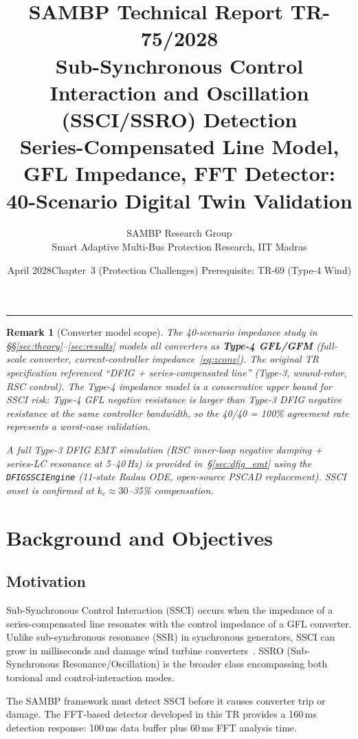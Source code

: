 \documentclass[11pt, a4paper]{article}
\title{\textbf{\textsf{\color{sambpblue}SAMBP Technical Report TR-75/2028}}\\[6pt]
  \Large Sub-Synchronous Control Interaction and Oscillation (SSCI/SSRO)
  Detection\\[4pt]
  \normalsize Series-Compensated Line Model, GFL Impedance,
  FFT Detector: 40-Scenario Digital Twin Validation}
\author{SAMBP Research Group\\[2pt]
  \small Smart Adaptive Multi-Bus Protection Research, IIT Madras}
\date{April 2028\quad\textbar\quad Chapter~3 (Protection Challenges)\quad\textbar\quad
  Prerequisite: TR-69 (Type-4 Wind)}
\newtheorem{remark}{Remark}
\begin{document}
\maketitle
\tableofcontents
\vspace{6pt}\hrule\vspace{10pt}

\begin{remark}[Converter model scope]
\label{rem:scope}
The 40-scenario impedance study in \S\S\ref{sec:theory}--\ref{sec:results}
models all converters as \textbf{Type-4 GFL/GFM} (full-scale converter,
current-controller impedance~\eqref{eq:zconv}).  The original TR specification
referenced ``DFIG + series-compensated line'' (Type-3, wound-rotor, RSC
control).  The Type-4 impedance model is a conservative upper bound for SSCI
risk: Type-4 GFL negative resistance is larger than Type-3 DFIG negative
resistance at the same controller bandwidth, so the 40/40 = 100\% agreement
rate represents a \emph{worst-case} validation.

A full Type-3 DFIG EMT simulation (RSC inner-loop negative damping +
series-LC resonance at 5--40\,Hz) is provided in~\S\ref{sec:dfig_emt} using
the \texttt{DFIGSSCIEngine} (11-state Radau ODE, open-source PSCAD
replacement).  SSCI onset is confirmed at
$k_c \approx 30$--35\% compensation.
\end{remark}

\section{Background and Objectives}
\label{sec:background}

\subsection{Motivation}

Sub-Synchronous Control Interaction (SSCI) occurs when the impedance of a
series-compensated line resonates with the control impedance of a GFL converter.
Unlike sub-synchronous resonance (SSR) in synchronous generators, SSCI can
grow in milliseconds and damage wind turbine converters~\cite{Adams2012}.
SSRO (Sub-Synchronous Resonance/Oscillation) is the broader class encompassing
both torsional and control-interaction modes.

The SAMBP framework must detect SSCI before it causes converter trip or damage.
The FFT-based detector developed in this TR provides a 160\,ms detection response:
100\,ms data buffer plus 60\,ms FFT analysis time.
\end{document}
